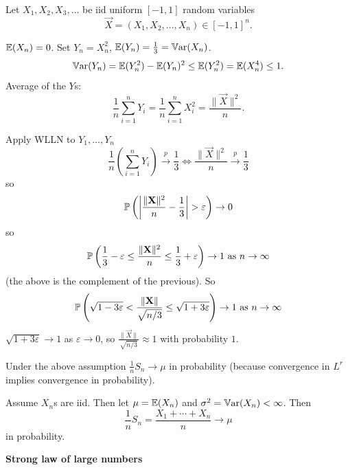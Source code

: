 \documentclass[10pt, a4paper]{article}
\begin{document}
\begin{example}
    Let $X_1, X_2, X_3, \dotsc$ be iid uniform $[-1, 1]$ random variables
    \[
    \vec{X} = (X_1, X_2, \dotsc, X_n) \in [-1, 1] ^ n.
    \]

    $\E(X_n) = 0$.
    Set $Y_n = X_n ^ 2$,
    $\E(Y_n) = \frac{1}{3} = \Var(X_n)$.
    \[
    \Var(Y_n) = \E(Y_n ^ 2) - \E(Y_n) ^ 2 \leq \E(Y_n ^ 2) = \E(X_n ^ 4) \leq 1.
    \]
    Average of the $Y$s:
    \[
    \frac{1}{n}\sum_{i = 1}^{n}Y_i = \frac{1}{n}\sum_{i = 1}^{n}X_i ^ 2 = \frac{\|\vec{X}\| ^ 2}{n}.
    \]

    Apply WLLN to $Y_1, \dotsc, Y_n$
    \[
    \frac{1}{n}\left(\sum_{i = 1}^{n}Y_i\right) \overset{p}{\to} \frac{1}{3} \iff \frac{\|\vec{X}\| ^ 2}{n} \overset{p}{\to} \frac{1}{3}
    \]
    so
    \[
    \P\left(\left|\frac{\|\vec{X}\| ^ 2}{n} - \frac{1}{3}\right| > \varepsilon\right) \to 0
    \]
    so
    \[
    \P\left(\frac{1}{3} - \varepsilon \leq \frac{\|\vec{X}\| ^ 2}{n} \leq \frac{1}{3} + \varepsilon\right) \to 1\text{ as } n \to \infty
    \]
    (the above is the complement of the previous).
    So
    \[
    \P\left(\sqrt{1 - 3\varepsilon} < \frac{\|\vec{X}\|}{\sqrt{n / 3}} \leq \sqrt{1 + 3\varepsilon}\right) \to 1\text{ as } n \to \infty
    \]
    $\sqrt{1 + 3\varepsilon} \to 1$ as $\varepsilon \to 0$,
    so $\frac{\|\vec{X}\|}{\sqrt{n / 3}} \approx 1$ with probability $1$.
\end{example}

\begin{corollary}
    Under the above assumption $\frac{1}{n}S_n \to \mu$ in probability
    (because convergence in $L ^ r$ implies convergence in probability).
\end{corollary}

\begin{corollary}
    Assume $X_n$s are iid.
    Then let $\mu = \E(X_n)$ and $\sigma ^ 2 = \Var(X_n) < \infty$.
    Then
    \[
    \frac{1}{n}S_n = \frac{X_1 + \dotsi + X_n}{n} \to \mu
    \]
    in probability.
\end{corollary}


\textbf{Strong law of large numbers}
\end{document}
